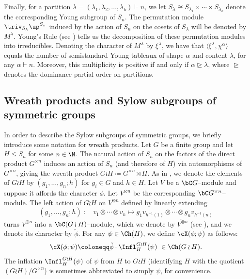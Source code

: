 Finally, for a partition $\lambda=(\lambda_1,\lambda_2,\dotsc,\lambda_k)\vdash n$, we let $S_\lambda\cong S_{\lambda_1}\times\cdots\times S_{\lambda_k}$ denote the corresponding Young subgroup of $S_n$. The permutation module $\triv_{S_\lambda}\up^{S_n}$ induced by the action of $S_n$ on the cosets of $S_\lambda$ will be denoted by $M^\lambda$. 
Young's Rule (see \cite[2.8.5]{JK}) tells us the decomposition of these permutation modules into irreducibles. Denoting the character of $M^\lambda$ by $\xi^\lambda$, we have that $\langle \xi^\lambda,\chi^\alpha\rangle$ equals the number of semistandard Young tableaux of shape $\alpha$ and content $\lambda$, for any $\alpha\vdash n$. Moreover, this multiplicity is positive if and only if $\alpha\trianglerighteq\lambda$, where $\trianglerighteq$ denotes the dominance partial order on partitions.



\subsection{Wreath products and Sylow subgroups of symmetric groups}
In order to describe the Sylow subgroups of symmetric groups, we briefly introduce some notation for wreath products. Let $G$ be a finite group and let $H\le S_n$ for some $n\in\N$. The natural action of $S_n$ on the factors of the direct product $G^{\times n}$ induces an action of $S_n$ (and therefore of $H$) via automorphisms of $G^{\times n}$, giving the wreath product $G\wr H\coloneqq  G^{\times n}\rtimes H$.  
As in \cite[Chapter 4]{JK}, we denote the elements of $G\wr H$ by $(g_1,\dotsc,g_n;h)$ for $g_i\in G$ and $h\in H$. Let $V$ be a $\bC G$--module and suppose it affords the character $\phi$. Let $V^{\otimes n}$ be the corresponding $\bC G^{\times n}$--module. The left action of $G\wr H$ on $V^{\otimes n}$ defined by linearly extending
\[ (g_1,\dotsc,g_n;h)\ :\quad v_1\otimes \cdots\otimes v_n \longmapsto g_1v_{h^{-1}(1)}\otimes\cdots\otimes g_nv_{h^{-1}(n)} \]
turns $V^{\otimes n}$ into a $\bC(G\wr H)$--module, which we denote by $\widetilde{V^{\otimes n}}$ (see \cite[(4.3.7)]{JK}), and we denote its character by $\tilde{\phi}$. For any $\psi\in\Ch(H)$, we define $\cX(\phi;\psi)$ as follows:
\[ \cX(\phi;\psi)\coloneqq \tilde{\phi}\cdot\Infl_H^{G\wr H}(\psi)\ \in\Ch(G\wr H). \]
The inflation $\Infl_H^{G\wr H}(\psi)$ of $\psi$ from $H$ to $G\wr H$ (identifying $H$ with the quotient $(G\wr H)/G^{\times n}$) is sometimes abbreviated to simply $\psi$, for convenience.

